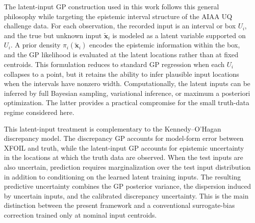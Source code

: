 \documentclass[a4paper,12pt]{article}
\newcommand{\x}{\mathbf{x}}
\begin{document}
The latent-input GP construction used in this work follows this general philosophy while targeting the epistemic interval structure of the AIAA UQ challenge data. For each observation, the recorded input is an interval or box $U_i$, and the true but unknown input $\tilde{\x}_i$ is modeled as a latent variable supported on $U_i$. A prior density $\pi_i(\tilde{\x}_i)$ encodes the epistemic information within the box, and the GP likelihood is evaluated at the latent locations rather than at fixed centroids. This formulation reduces to standard GP regression when each $U_i$ collapses to a point, but it retains the ability to infer plausible input locations when the intervals have nonzero width. Computationally, the latent inputs can be inferred by full Bayesian sampling, variational inference, or maximum a posteriori optimization. The latter provides a practical compromise for the small truth-data regime considered here.

This latent-input treatment is complementary to the Kennedy--O'Hagan discrepancy model. The discrepancy GP accounts for model-form error between XFOIL and truth, while the latent-input GP accounts for epistemic uncertainty in the locations at which the truth data are observed. When the test inputs are also uncertain, prediction requires marginalization over the test input distribution in addition to conditioning on the learned latent training inputs. The resulting predictive uncertainty combines the GP posterior variance, the dispersion induced by uncertain inputs, and the calibrated discrepancy uncertainty. This is the main distinction between the present framework and a conventional surrogate-bias correction trained only at nominal input centroids.
\end{document}

